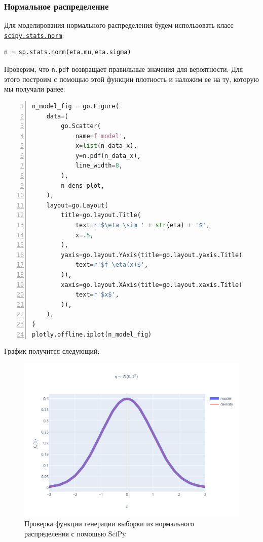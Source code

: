 \documentclass[
  russian,
  a4paper,
]{article}
\newcommand{\passthrough}[1]{#1}
\begin{document}
\hypertarget{ux43dux43eux440ux43cux430ux43bux44cux43dux43eux435-ux440ux430ux441ux43fux440ux435ux434ux435ux43bux435ux43dux438ux435-2}{%
\subsubsection{Нормальное
распределение}\label{ux43dux43eux440ux43cux430ux43bux44cux43dux43eux435-ux440ux430ux441ux43fux440ux435ux434ux435ux43bux435ux43dux438ux435-2}}

Для моделирования нормального распределения будем использовать класс
\href{https://docs.scipy.org/doc/scipy/reference/generated/scipy.stats.hypergeom.html}{\passthrough{\lstinline!scipy.stats.norm!}}:

\begin{lstlisting}[language=Python]
n = sp.stats.norm(eta.mu,eta.sigma)
\end{lstlisting}

Проверим, что \passthrough{\lstinline!n.pdf!} возвращает правильные
значения для вероятности. Для этого построим с помощью этой функции
плотность и наложим ее на ту, которую мы получали ранее:

\begin{lstlisting}[language=Python, numbers=left]
n_model_fig = go.Figure(
    data=(
        go.Scatter(
            name=f'model',
            x=list(n_data_x),
            y=n.pdf(n_data_x),
            line_width=8,
        ),
        n_dens_plot,
    ),
    layout=go.Layout(
        title=go.layout.Title(
            text=r'$\eta \sim ' + str(eta) + '$',
            x=.5,
        ),
        yaxis=go.layout.YAxis(title=go.layout.yaxis.Title(
            text=r'$f_\eta(x)$',
        )),
        xaxis=go.layout.XAxis(title=go.layout.xaxis.Title(
            text=r'$x$',
        )),
    ),
)
plotly.offline.iplot(n_model_fig)
\end{lstlisting}

График получится следующий:

\begin{figure}
\centering
\includegraphics{../assets/n_model_fig.svg}
\caption{Проверка функции генерации выборки из нормального распределения
с помощью SciPy}
\end{figure}
\end{document}
